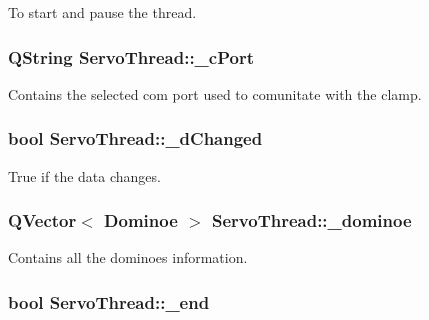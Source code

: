 To start and pause the thread. 

\hypertarget{a00008_ab52437b31a433c427a6c050f2b1cc959}{}
\subsubsection[{\+\_\+c\+Port}]{\setlength{\rightskip}{0pt plus 5cm}Q\+String Servo\+Thread\+::\+\_\+c\+Port\hspace{0.3cm}{\ttfamily [private]}}\label{a00008_ab52437b31a433c427a6c050f2b1cc959}


Contains the selected com port used to comunitate with the clamp. 

\hypertarget{a00008_a2b6ccfeacbb3cc9ac5c34549b9aa3f11}{}
\subsubsection[{\+\_\+d\+Changed}]{\setlength{\rightskip}{0pt plus 5cm}bool Servo\+Thread\+::\+\_\+d\+Changed\hspace{0.3cm}{\ttfamily [private]}}\label{a00008_a2b6ccfeacbb3cc9ac5c34549b9aa3f11}


True if the data changes. 

\hypertarget{a00008_aeeb7452b80b36d66b59add7f55061a99}{}
\subsubsection[{\+\_\+dominoe}]{\setlength{\rightskip}{0pt plus 5cm}Q\+Vector$<$ {\bf Dominoe} $>$ Servo\+Thread\+::\+\_\+dominoe\hspace{0.3cm}{\ttfamily [private]}}\label{a00008_aeeb7452b80b36d66b59add7f55061a99}


Contains all the dominoes information. 

\hypertarget{a00008_acca9896d1a2d1ef68527e6834f81c76c}{}
\subsubsection[{\+\_\+end}]{\setlength{\rightskip}{0pt plus 5cm}bool Servo\+Thread\+::\+\_\+end\hspace{0.3cm}{\ttfamily [private]}}\label{a00008_acca9896d1a2d1ef68527e6834f81c76c}


